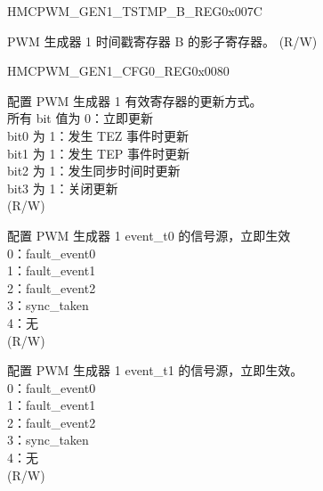 \begin{register}{H}{MCPWM\_GEN1\_TSTMP\_B\_REG}{0x007C}\label{regdesc:MCPWMGEN1TSTMPBREG}
%
%
\regnewline%
\begin{regdesc}\begin{reglist}
\label{fielddesc:MCPWMGEN1B}\item [MCPWM\_GEN1\_B] PWM 生成器 1 时间戳寄存器 B 的影子寄存器。 (R/W)
\end{reglist}\end{regdesc}
\end{register}


\begin{register}{H}{MCPWM\_GEN1\_CFG0\_REG}{0x0080}\label{regdesc:MCPWMGEN1CFG0REG}
%
%
%
%
\regnewline%
\begin{regdesc}\begin{reglist}
\label{fielddesc:MCPWMGEN1CFGUPMETHOD}\item [MCPWM\_GEN1\_CFG\_UPMETHOD] 配置 PWM 生成器 1 有效寄存器的更新方式。\\
所有 bit 值为 0：立即更新\\
bit0 为 1：发生 TEZ 事件时更新\\
bit1 为 1：发生 TEP 事件时更新\\
bit2 为 1：发生同步时间时更新\\
bit3 为 1：关闭更新\\
(R/W)
\label{fielddesc:MCPWMGEN1T0SEL}\item [MCPWM\_GEN1\_T0\_SEL] 配置 PWM 生成器 1 event\_t0 的信号源，立即生效\\
0：fault\_event0\\
1：fault\_event1\\
2：fault\_event2\\
3：sync\_taken\\
4：无\\
(R/W)
\label{fielddesc:MCPWMGEN1T1SEL}\item [MCPWM\_GEN1\_T1\_SEL] 配置 PWM 生成器 1 event\_t1 的信号源，立即生效。\\
0：fault\_event0\\
1：fault\_event1\\
2：fault\_event2\\
3：sync\_taken\\
4：无\\
(R/W)
\end{reglist}\end{regdesc}
\end{register}


